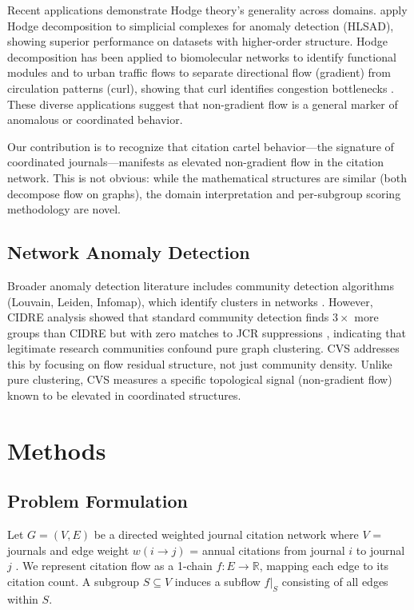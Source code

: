 \documentclass[11pt,letterpaper]{article}
\begin{document}
Recent applications demonstrate Hodge theory's generality across domains. \citet{Frantzen2025} apply Hodge decomposition to simplicial complexes for anomaly detection (HLSAD), showing superior performance on datasets with higher-order structure. Hodge decomposition has been applied to biomolecular networks to identify functional modules \citep{Wei2022} and to urban traffic flows to separate directional flow (gradient) from circulation patterns (curl), showing that curl identifies congestion bottlenecks \citep{Sun2024}. These diverse applications suggest that non-gradient flow is a general marker of anomalous or coordinated behavior.

Our contribution is to recognize that citation cartel behavior---the signature of coordinated journals---manifests as elevated non-gradient flow in the citation network. This is not obvious: while the mathematical structures are similar (both decompose flow on graphs), the domain interpretation and per-subgroup scoring methodology are novel.

\subsection{Network Anomaly Detection}

Broader anomaly detection literature includes community detection algorithms (Louvain, Leiden, Infomap), which identify clusters in networks \citep{Newman2003}. However, CIDRE analysis showed that standard community detection finds $3\times$ more groups than CIDRE but with zero matches to JCR suppressions \citep{Kojaku2021}, indicating that legitimate research communities confound pure graph clustering. CVS addresses this by focusing on flow residual structure, not just community density. Unlike pure clustering, CVS measures a specific topological signal (non-gradient flow) known to be elevated in coordinated structures.

\section{Methods}

\subsection{Problem Formulation}

Let $G = (V, E)$ be a directed weighted journal citation network where $V$ = journals and edge weight $w(i \to j)$ = annual citations from journal $i$ to journal $j$ \citep{Frantzen2025}. We represent citation flow as a 1-chain $f : E \to \mathbb{R}$, mapping each edge to its citation count. A subgroup $S \subseteq V$ induces a subflow $f|_S$ consisting of all edges within $S$.
\end{document}
